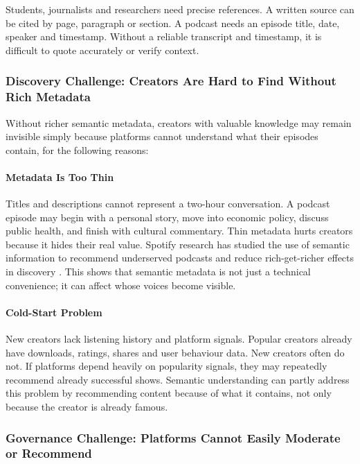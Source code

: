 \documentclass[11pt,a4paper]{article}
\begin{document}
Students, journalists and researchers need precise references. A written source can be cited by page, paragraph or section. A podcast needs an episode title, date, speaker and timestamp. Without a reliable transcript and timestamp, it is difficult to quote accurately or verify context.

\subsubsection{Discovery Challenge: Creators Are Hard to Find Without Rich Metadata}

Without richer semantic metadata, creators with valuable knowledge may remain invisible simply because platforms cannot understand what their episodes contain, for the following reasons:

\paragraph{Metadata Is Too Thin}

Titles and descriptions cannot represent a two-hour conversation. A podcast episode may begin with a personal story, move into economic policy, discuss public health, and finish with cultural commentary. Thin metadata hurts creators because it hides their real value. Spotify research has studied the use of semantic information to recommend underserved podcasts and reduce rich-get-richer effects in discovery \cite{Aziz2021Underserved}. This shows that semantic metadata is not just a technical convenience; it can affect whose voices become visible.

\paragraph{Cold-Start Problem}

New creators lack listening history and platform signals. Popular creators already have downloads, ratings, shares and user behaviour data. New creators often do not. If platforms depend heavily on popularity signals, they may repeatedly recommend already successful shows. Semantic understanding can partly address this problem by recommending content because of what it contains, not only because the creator is already famous.

\subsubsection{Governance Challenge: Platforms Cannot Easily Moderate or Recommend}
\end{document}
